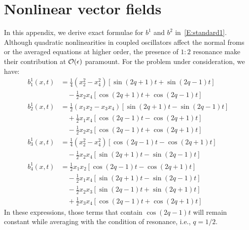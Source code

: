 \section{Nonlinear vector fields}
\label{A:autoparam nonlin vec fields}

In this appendix, we derive exact formulae for $b^1$ and $b^2$ in~\eqref{E:standard1}. Although quadratic nonlinearities in coupled oscillators affect the normal froms or the averaged equations at higher order, the presence of $1:2$ resonance make their contribution at ${\mathcal{O}}(\epsilon)$ paramount. For the problem under consideration, we have:
\begin{align*}
b^1_1(x,t) &= \frac{1}{4} (x_2^2 - x_4^2) [\sin(2q + 1)t + \sin(2q - 1)t]\\
&\quad - \frac12 x_2 x_4 [\cos(2q + 1)t + \cos(2q - 1)t]\\
b^1_2(x,t) &= \frac12 (x_1 x_2 - x_3 x_4) [\sin(2q + 1)t - \sin(2q - 1)t]\\
&\quad + \frac12 x_1 x_4 [\cos (2q - 1)t - \cos(2q + 1)t]\\
&\quad - \frac12 x_2 x_3 [\cos(2q - 1)t + \cos(2q + 1)t]\\
b^1_3(x,t) &= \frac14 (x_2^2 - x_4^2) [\cos(2q - 1)t - \cos(2q + 1)t]\\
&\quad - \frac12 x_2 x_4 [\sin(2q + 1)t - \sin(2q - 1)t]\\
b^1_4(x,t) &= \frac12 x_1 x_2 [\cos(2q - 1)t - \cos(2q + 1)t]\\
&\quad - \frac12 x_1 x_4 [\sin(2q + 1)t - \sin(2q - 1)t]\\
&\quad - \frac12 x_2 x_3 [\sin(2q - 1)t + \sin(2q + 1)t]\\
&\quad + \frac12 x_3 x_4 [\cos(2q - 1)t + \cos(2q + 1)t]
\end{align*}
In these expressions, those terms that contain $\cos(2q - 1)t$ will remain constant while averaging with the condition of resonance, i.e., $q=1/2$.

